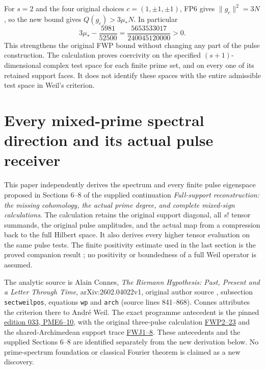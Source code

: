 \documentclass[11pt,a4paper]{article}
\theoremstyle{definition}\newtheorem{definition}[theorem]{Definition}
\begin{document}
For \(s=2\) and the four original choices \(c=(1,\pm1,\pm1)\),
FP6 gives \(\|g_c\|^2=3N\), so the new bound gives
\(Q(g_c)>3\mu_*N\). In particular
\[
 3\mu_*-\frac{5981}{52500}
 =\frac{5653533017}{240045120000}>0.
 \tag{FP44}\label{fp:fpb:old-comparison}
\]
This strengthens the original FWP bound without changing any
part of the pulse construction. The calculation proves coercivity
on the specified \((s+1)\)-dimensional complex test space for each
finite prime set, and on every one of its retained support faces.
It does not identify these spaces with the entire admissible
test space in Weil's criterion.


\section{Every mixed-prime spectral direction and its actual pulse receiver}


This paper independently derives the spectrum and every finite pulse
eigenspace proposed in Sections 6--8 of the supplied continuation
\emph{Full-support reconstruction: the missing cohomology, the actual
prime degree, and complete mixed-sign calculations}.  The calculation
retains the original support diagonal, all $s!$ tensor summands, the
original pulse amplitudes, and the actual map from a compression back
to the full Hilbert space.  It also derives every higher tensor
evaluation on the same pulse tests.  The finite positivity estimate
used in the last section is the proved companion result \cite{FinitePrimePulse};
no positivity or boundedness of a full Weil operator is assumed.

The analytic source is Alain Connes, \emph{The Riemann Hypothesis:
Past, Present and a Letter Through Time}, arXiv:2602.04022v1,
original author source , subsection
\texttt{sectweilpos}, equations \texttt{wp} and \texttt{arch}
(source lines 841--868).  Connes attributes the criterion there to
Andr\'e Weil.  The exact programme antecedent is the pinned
\href{https://github.com/KokunoYumeto/zeta-function-research-reader/blob/3c78cfbd9e194d35117b33277c421c6564ce3dbf/workbenches/splitzero-tandem/continuations/20260923-full-prime-support/033/MIXED_PRIME_ENERGY_AND_BOUNDARY.tex#L209}{edition 033, PME6--10},
with the original three-pulse calculation
\href{https://github.com/KokunoYumeto/zeta-function-research-reader/blob/3c78cfbd9e194d35117b33277c421c6564ce3dbf/workbenches/splitzero-tandem/continuations/20260923-full-prime-support/033/MIXED_PRIME_ENERGY_AND_BOUNDARY.tex#L648}{FWP2--23}
and the shared-Archimedean support trace
\href{https://github.com/KokunoYumeto/zeta-function-research-reader/blob/3c78cfbd9e194d35117b33277c421c6564ce3dbf/workbenches/splitzero-tandem/continuations/20260923-full-prime-support/033/MIXED_PRIME_ENERGY_AND_BOUNDARY.tex#L1005}{FWJ1--8}.
These antecedents and the supplied Sections 6--8 are identified
separately from the new derivation below.  No prime-spectrum foundation
or classical Fourier theorem is claimed as a new discovery.
\end{document}
